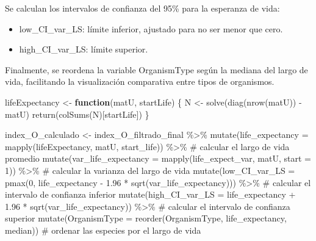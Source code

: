 \documentclass[
  12pt,
  letterpaper,
]{book}
\newenvironment{Shaded}{\begin{snugshade}}{\end{snugshade}}
\newcommand{\AttributeTok}[1]{\textcolor[rgb]{0.40,0.45,0.13}{#1}}
\newcommand{\CommentTok}[1]{\textcolor[rgb]{0.37,0.37,0.37}{#1}}
\newcommand{\ControlFlowTok}[1]{\textcolor[rgb]{0.00,0.23,0.31}{\textbf{#1}}}
\newcommand{\DecValTok}[1]{\textcolor[rgb]{0.68,0.00,0.00}{#1}}
\newcommand{\FloatTok}[1]{\textcolor[rgb]{0.68,0.00,0.00}{#1}}
\newcommand{\FunctionTok}[1]{\textcolor[rgb]{0.28,0.35,0.67}{#1}}
\newcommand{\NormalTok}[1]{\textcolor[rgb]{0.00,0.23,0.31}{#1}}
\newcommand{\OtherTok}[1]{\textcolor[rgb]{0.00,0.23,0.31}{#1}}
\newcommand{\SpecialCharTok}[1]{\textcolor[rgb]{0.37,0.37,0.37}{#1}}
\providecommand{\tightlist}{%
  \setlength{\itemsep}{0pt}\setlength{\parskip}{0pt}}\usepackage{longtable,booktabs,array}
\begin{document}
Se calculan los intervalos de confianza del 95\% para la esperanza de
vida:

\begin{itemize}
\tightlist
\item
  low\_CI\_var\_LS: límite inferior, ajustado para no ser menor que
  cero.
\item
  high\_CI\_var\_LS: límite superior.
\end{itemize}

Finalmente, se reordena la variable OrganismType según la mediana del
largo de vida, facilitando la visualización comparativa entre tipos de
organismos.

\begin{Shaded}
\begin{Highlighting}[]
\NormalTok{lifeExpectancy }\OtherTok{\textless{}{-}} \ControlFlowTok{function}\NormalTok{(matU, startLife) \{}
\NormalTok{  N }\OtherTok{\textless{}{-}} \FunctionTok{solve}\NormalTok{(}\FunctionTok{diag}\NormalTok{(}\FunctionTok{nrow}\NormalTok{(matU)) }\SpecialCharTok{{-}}\NormalTok{ matU)}
  \FunctionTok{return}\NormalTok{(}\FunctionTok{colSums}\NormalTok{(N)[startLife])}
\NormalTok{\}}


\NormalTok{index\_O\_calculado }\OtherTok{\textless{}{-}}\NormalTok{ index\_O\_filtrado\_final }\SpecialCharTok{\%\textgreater{}\%}
  \FunctionTok{mutate}\NormalTok{(}\AttributeTok{life\_expectancy =} \FunctionTok{mapply}\NormalTok{(lifeExpectancy, matU, start\_life)) }\SpecialCharTok{\%\textgreater{}\%} \CommentTok{\# calcular el largo de vida promedio}
  \FunctionTok{mutate}\NormalTok{(}\AttributeTok{var\_life\_expectancy =} \FunctionTok{mapply}\NormalTok{(life\_expect\_var, matU, }\AttributeTok{start =} \DecValTok{1}\NormalTok{)) }\SpecialCharTok{\%\textgreater{}\%} \CommentTok{\# calcular la varianza del largo de vida}
  \FunctionTok{mutate}\NormalTok{(}\AttributeTok{low\_CI\_var\_LS =} \FunctionTok{pmax}\NormalTok{(}\DecValTok{0}\NormalTok{, life\_expectancy }\SpecialCharTok{{-}} \FloatTok{1.96} \SpecialCharTok{*} \FunctionTok{sqrt}\NormalTok{(var\_life\_expectancy))) }\SpecialCharTok{\%\textgreater{}\%} \CommentTok{\# calcular el intervalo de confianza inferior}
  \FunctionTok{mutate}\NormalTok{(}\AttributeTok{high\_CI\_var\_LS =}\NormalTok{ life\_expectancy }\SpecialCharTok{+} \FloatTok{1.96} \SpecialCharTok{*} \FunctionTok{sqrt}\NormalTok{(var\_life\_expectancy)) }\SpecialCharTok{\%\textgreater{}\%} \CommentTok{\# calcular el intervalo de confianza superior}
  \FunctionTok{mutate}\NormalTok{(}\AttributeTok{OrganismType =} \FunctionTok{reorder}\NormalTok{(OrganismType, life\_expectancy, median)) }\CommentTok{\# ordenar las especies por el largo de vida }
\end{Highlighting}
\end{Shaded}
\end{document}
